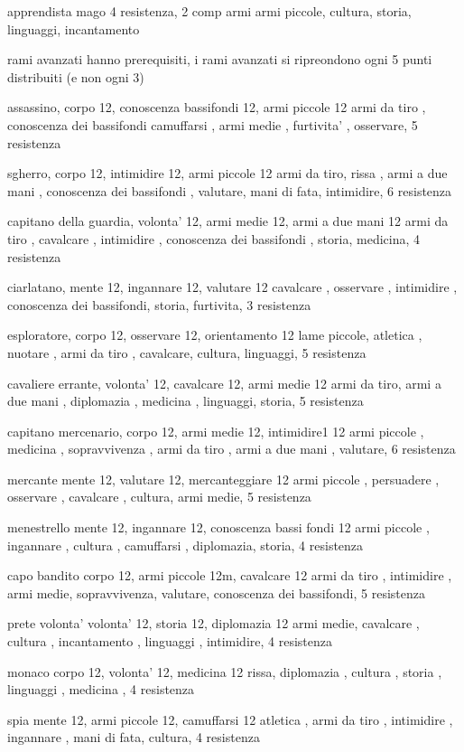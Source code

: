 \documentclass[12pt,a4paper,twoside,openany]{book}
\begin{document}
apprendista mago  4 resistenza, 2 comp armi
armi piccole, cultura,  storia, linguaggi, incantamento


rami avanzati hanno prerequisiti, i rami avanzati si ripreondono ogni 5 punti distribuiti (e non ogni 3)


assassino, corpo 12, conoscenza bassifondi 12, armi piccole 12
armi da tiro , conoscenza dei bassifondi  camuffarsi , armi medie , furtivita' , osservare, 5 resistenza

sgherro, corpo 12, intimidire 12, armi piccole 12
armi da tiro, rissa , armi a due mani , conoscenza dei bassifondi , valutare, mani  di fata, intimidire,  6 resistenza

capitano della guardia, volonta' 12, armi medie 12, armi a due mani 12
armi da tiro , cavalcare , intimidire , conoscenza dei bassifondi , storia, medicina, 4 resistenza

ciarlatano, mente 12, ingannare 12, valutare 12
cavalcare , osservare ,  intimidire , conoscenza dei bassifondi, storia, furtivita,  3 resistenza

esploratore, corpo 12, osservare 12, orientamento 12
lame piccole, atletica ,  nuotare , armi da tiro ,  cavalcare, cultura,  linguaggi,  5 resistenza

cavaliere errante, volonta' 12, cavalcare 12, armi medie 12
armi da tiro, armi a due mani , diplomazia , medicina , linguaggi, storia,  5 resistenza

capitano mercenario, corpo 12, armi medie 12, intimidire1 12
armi piccole , medicina , sopravvivenza , armi da tiro , armi a due mani , valutare,  6 resistenza

mercante mente 12, valutare 12, mercanteggiare 12
armi piccole , persuadere  ,  osservare , cavalcare , cultura, armi medie,  5 resistenza

menestrello mente 12, ingannare 12, conoscenza bassi fondi 12
armi piccole , ingannare , cultura , camuffarsi , diplomazia, storia,  4 resistenza

capo bandito corpo 12, armi piccole 12m, cavalcare 12
armi da tiro , intimidire , armi medie, sopravvivenza, valutare, conoscenza dei bassifondi, 5 resistenza

prete volonta' volonta' 12, storia 12, diplomazia 12
armi medie, cavalcare ,  cultura , incantamento , linguaggi , intimidire,  4 resistenza

monaco corpo 12, volonta' 12, medicina 12
rissa, diplomazia  , cultura , storia , linguaggi , medicina ,  4 resistenza

spia mente 12, armi piccole 12, camuffarsi 12
atletica , armi da tiro ,  intimidire , ingannare , mani di fata, cultura,  4 resistenza
\end{document}
